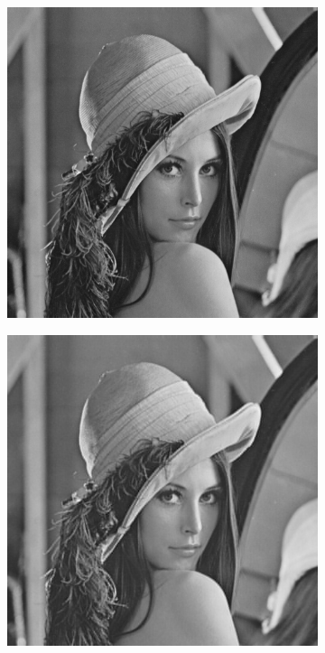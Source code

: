 \begin{figure}[h!]
\begin{subfigure}[b]{0.3\linewidth}
		\caption{}
		\label{fig:7zonal2diff}
	\end{subfigure}
	\begin{subfigure}[b]{0.3\linewidth}
		\includegraphics[width=\linewidth]{myfigure/p7/lenna.png}
		\caption{}
		\label{fig:lenna}
	\end{subfigure}
	\begin{subfigure}[b]{0.3\linewidth}
		\includegraphics[width=\linewidth]{myfigure/p7/7_zonal_5.png}

\end{subfigure}
\end{figure}
